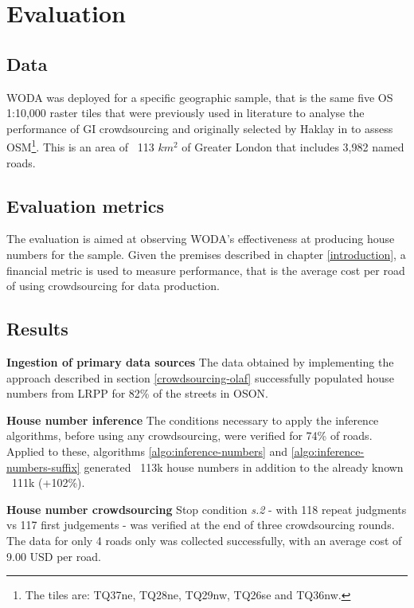 \section{Evaluation}

\subsection{Data}

WODA was deployed for a specific geographic sample, that is the same five OS 1:10,000 raster tiles that were previously used in literature to analyse the performance of GI crowdsourcing and originally selected by Haklay in \cite{Haklay:2010vs} to assess OSM\footnote{The tiles are: TQ37ne, TQ28ne, TQ29nw, TQ26se and TQ36nw.}. This is an area of ~113 $ km^2 $ of Greater London that includes 3,982 named roads. 

\subsection{Evaluation metrics}

The evaluation is aimed at observing WODA's effectiveness at producing house numbers for the sample. Given the premises described in chapter \ref{introduction}, a financial metric is used to measure performance, that is the average cost per road of using crowdsourcing for data production. 

\subsection{Results}

\textbf{Ingestion of primary data sources} The data obtained by implementing the approach described in section \ref{crowdsourcing-olaf} successfully populated house numbers from LRPP for 82\% of the streets in OSON.

\textbf{House number inference} The conditions necessary to apply the inference algorithms, before using any crowdsourcing, were verified for 74\% of roads. Applied to these, algorithms \ref{algo:inference-numbers} and \ref{algo:inference-numbers-suffix} generated ~113k house numbers in addition to the already known ~111k (+102\%). 

\textbf{House number crowdsourcing} Stop condition {\it s.2} - with 118 repeat judgments vs 117 first judgements - was verified at the end of three crowdsourcing rounds.  The data for only 4 roads only was collected successfully, with an average cost of 9.00 USD per road. 

